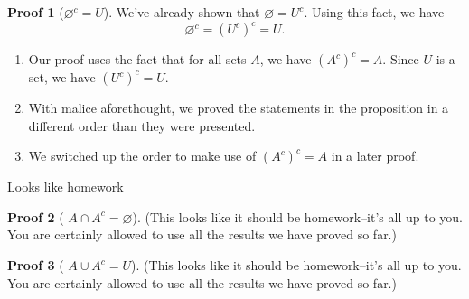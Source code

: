 \documentclass[fleqn]{beamer}
\theoremstyle{definition}
\newtheorem{myproof}{Proof}[]
\newenvironment{checklist}{
  \begin{enumerate}[\ding{51}]
    \addtolength{\itemsep}{-0.0\itemsep}}
  {\end{enumerate}}
\begin{document}
\begin{frame}

\begin{myproof}[\(  \varnothing^c = U\)] 
We've already shown that \(\varnothing = U^c\).  Using this fact, we have
\[
 \varnothing^c  = (U^c)^c = U.
\]
\end{myproof}

\begin{checklist}

\item Our proof uses the fact that for all sets \(A\), we have \((A^c)^c = A\).  Since \(U\) is a set, we have \( (U^c)^c = U\).

\vspace{0.2in}
\item With malice aforethought, we proved the statements in the proposition in a different order than they were presented.

\vspace{0.2in}
\item  We switched up the order to make use of \((A^c)^c = A\) in a later proof.
\end{checklist}
\end{frame}

\begin{frame}{Looks like homework}


\begin{myproof}[  \(A \cap A^c = \varnothing\)] 

(This looks like it should be homework--it's all up to you. You are certainly allowed to use all the results we have proved so far.)
\end{myproof}

\vspace{0.2in}

\begin{myproof}[  \(A \cup A^c = U \)] 
(This looks like it should be homework--it's all up to you. You are certainly allowed to use all the results we have proved so far.)
\end{myproof}
\end{frame}
\end{document}
